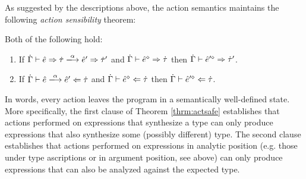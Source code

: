 \documentclass{llncs}
\begin{document}
As suggested by the descriptions above, the action semantics maintains the following \emph{action sensibility} theorem:
\begin{theorem} Both of the following hold:
\label{thrm:actsafe}
\begin{enumerate}
\item If $\performSyn{\hGamma}{\zexp}{\htau}{\alpha}{\zexp'}{\htau'}$ and
  $\dot{\Gamma} \vdash \hat{e}^{\diamond} \Rightarrow \dot{\tau}$ then
  $\dot{\Gamma} \vdash \hat{e}'^{\diamond} \Rightarrow \dot{\tau}'$.
\item If $\performAna{\hGamma}{\zexp}{\htau}{\alpha}{\zexp'}$ and
  $\dot{\Gamma} \vdash \hat{e}^{\diamond} \Leftarrow \dot{\tau}$ then
  $\dot{\Gamma} \vdash \hat{e}'^{\diamond} \Leftarrow \dot{\tau}$.
\end{enumerate}
\end{theorem}
In words, every action leaves the program in a semantically well-defined state. More specifically, the first clause of Theorem \ref{thrm:actsafe} establishes that actions performed on expressions that synthesize a type can only produce expressions that also synthesize some (possibly different) type. The second clause establishes that actions performed on expressions in analytic position (e.g. those under type ascriptions or in argument position, see above) can only produce expressions that can also be analyzed against the expected type.%
\end{document}
